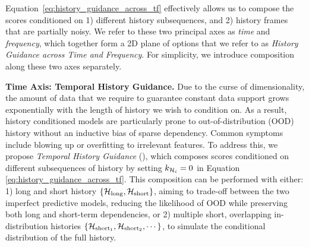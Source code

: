 Equation~\ref{eq:history_guidance_across_tf} effectively allows us to compose the scores conditioned on 1) different history subsequences, and 2) history frames that are partially noisy. We refer to these two principal axes as \emph{time} and \emph{frequency}, which together form a 2D plane of options that we refer to as \emph{History Guidance across Time and Frequency}. For simplicity, we introduce composition along these two axes separately.




\textbf{Time Axis: Temporal History Guidance.}
Due to the curse of dimensionality, the amount of data that we require to guarantee constant data support grows exponentially with the length of history we wish to condition on. As a result, history conditioned models are particularly prone to out-of-distribution (OOD) history without an inductive bias of sparse dependency. Common symptoms include blowing up or overfitting to irrelevant features. To address this, we propose \emph{Temporal History Guidance} (\HGt), which composes scores conditioned on different subsequences of history by setting $k_{{\mathcal{H}}_i} = 0$ in Equation \ref{eq:history_guidance_across_tf}.
This composition can be performed with either: 1) long and short history $\{{\mathcal{H}}_{\text{long}}, {\mathcal{H}}_{\text{short}}\}$, aiming to trade-off between the two imperfect predictive models, reducing the likelihood of OOD while preserving both long and short-term dependencies, or 2) multiple short, overlapping in-distribution histories $\{{\mathcal{H}}_{\text{short}_1}, {\mathcal{H}}_{\text{short}_2}, \cdots\}$, to simulate the conditional distribution of the full history.




